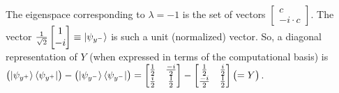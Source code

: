 The eigenspace corresponding to $\lambda = -1$ is the set of vectors $\begin{bmatrix}c \\ -i\cdot c\end{bmatrix}$.  The vector $\frac{1}{\sqrt{2}}\begin{bmatrix} 1 \\ -i\end{bmatrix}\equiv\ket{\psi_{y^-}}$ is such a unit (normalized) vector.  So, a diagonal representation of $Y$ (when expressed in terms of the computational basis) is $\bigl(\ket{\psi_{y^+}}\bra{\psi_{y^+}}\bigr) - \bigl(\ket{\psi_{y^-}}\bra{\psi_{y^-}}\bigr) = \begin{bmatrix}\frac{1}{2} & \frac{-i}{2} \\ \frac{i}{2} & \frac{1}{2}\end{bmatrix} - \begin{bmatrix}\frac{1}{2} & \frac{i}{2} \\ \frac{-i}{2} & \frac{1}{2}\end{bmatrix} \bigl( = Y\bigr)$.

